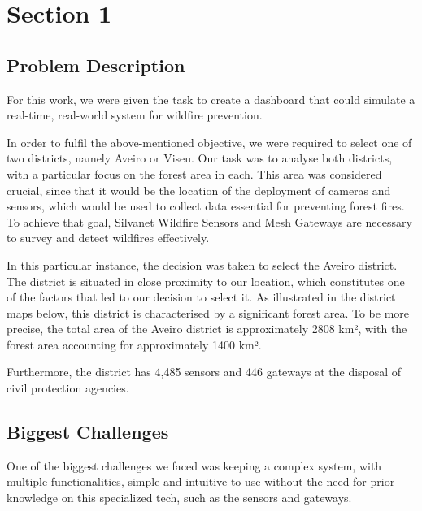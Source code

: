 \chapter{Section 1} \label{section1}
\section{Problem Description}
For this work, we were given the task to create a dashboard 
that could simulate a real-time, real-world system for wildfire 
prevention. \par
In order to fulfil the above-mentioned objective, 
we were required to select one of two districts, 
namely Aveiro or Viseu. Our task was to analyse both districts, 
with a particular focus on the forest area in each. 
This area was considered crucial, since that it would be 
the location of the deployment of cameras and sensors, 
which would be used to collect data essential for preventing forest fires. 
To achieve
that goal, Silvanet Wildfire Sensors and Mesh Gateways are necessary to
survey and detect wildfires effectively. \par
In this particular instance, the decision was taken to select the Aveiro district. The district is situated in close proximity to our location, which constitutes one of the factors that led to our decision to select it. As illustrated in the district maps below, this district is characterised by a significant forest area. To be more precise, the total area of the Aveiro district is approximately 2808 km², with the forest area accounting for approximately 1400 km². \par
Furthermore, the district has 4,485 sensors and 446 gateways at the disposal of civil protection agencies. \par
\section{Biggest Challenges}
One of the biggest challenges we faced was keeping a complex system, with multiple functionalities, simple
and intuitive to use without the need for prior knowledge on this
specialized tech, such as the sensors and gateways. 
